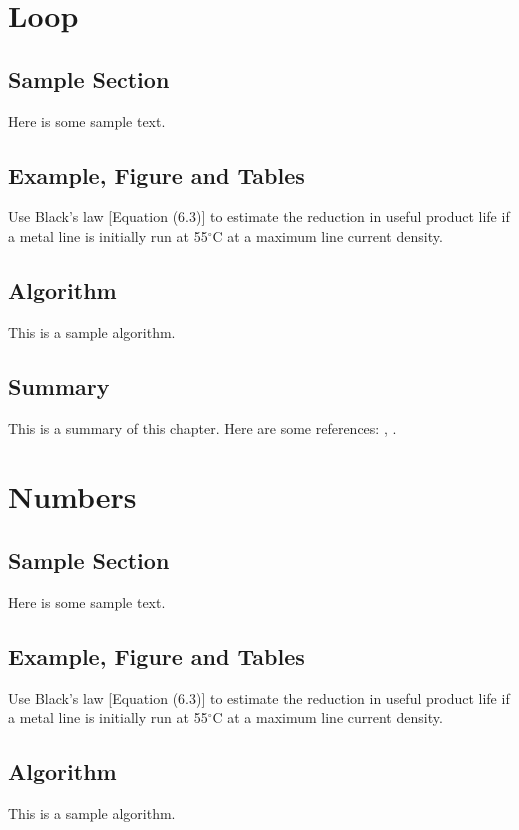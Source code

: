 \documentclass{wileySix}
\begin{document}
\chapter{Loop}

\section{Sample Section}
Here is some sample text.

\section{Example, Figure and Tables}
\vskip6pt
\begin{example}
	Use Black's law [Equation (6.3)] to estimate the reduction in useful product
	life if a metal line is initially run at 55$^\circ$C at a maximum line
	current density.
\end{example}

\section{Algorithm}
This is a sample algorithm.

\section{Summary}
This is a summary of this chapter.
Here are some references: \cite{xkilby}, \cite{xberen}.

\chapter{Numbers}

\section{Sample Section}
Here is some sample text.

\section{Example, Figure and Tables}
\vskip6pt
\begin{example}
	Use Black's law [Equation (6.3)] to estimate the reduction in useful product
	life if a metal line is initially run at 55$^\circ$C at a maximum line
	current density.
\end{example}

\section{Algorithm}
This is a sample algorithm.
\end{document}
